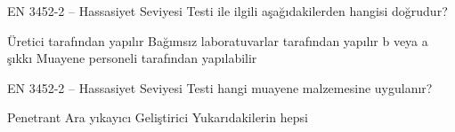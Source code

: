 \begin{question}[subtitle=]
EN 3452-2 – Hassasiyet Seviyesi Testi  ile ilgili aşağıdakilerden hangisi doğrudur?
	\begin{tasks}
          \task Üretici tarafından yapılır
          \task Bağımsız laboratuvarlar tarafından yapılır
          \task b veya a şıkkı \correct
          \task Muayene personeli tarafından yapılabilir
	\end{tasks}
\end{question}
\begin{solution}
	\correct
\end{solution}

\begin{question}[subtitle=]
EN 3452-2 – Hassasiyet Seviyesi Testi  hangi muayene malzemesine uygulanır?
	\begin{tasks}
          \task Penetrant
          \task Ara yıkayıcı
          \task Geliştirici
          \task Yukarıdakilerin hepsi \correct
	\end{tasks}
\end{question}
\begin{solution}
	\correct
\end{solution}
